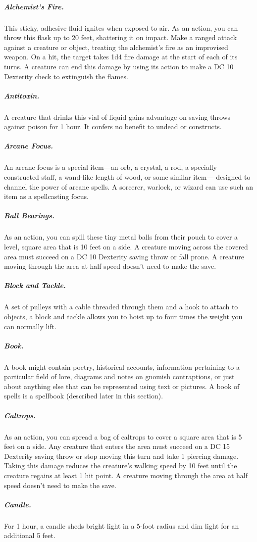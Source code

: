 \subparagraph*{Alchemist's Fire.} This sticky, adhesive fluid ignites when exposed to air. As an action, you can throw this flask up to 20 feet, shattering it on impact. Make a ranged attack against a creature or object, treating the alchemist's fire as an improvised weapon. On a hit, the target takes 1d4 fire damage at the start of each of its turns. A creature can end this damage by using its action to make a DC 10 Dexterity check to extinguish the flames.

\subparagraph*{Antitoxin.} A creature that drinks this vial of liquid gains advantage on saving throws against poison for 1 hour. It confers no benefit to undead or constructs.

\subparagraph*{Arcane Focus.} An arcane focus is a special item—an orb, a crystal, a rod, a specially constructed staff, a wand-like length of wood, or some similar item— designed to channel the power of arcane spells. A sorcerer, warlock, or wizard can use such an item as a spellcasting focus.

\subparagraph*{Ball Bearings.} As an action, you can spill these tiny metal balls from their pouch to cover a level, square area that is 10 feet on a side. A creature moving across the covered area must succeed on a DC 10 Dexterity saving throw or fall prone. A creature moving through the area at half speed doesn't need to make the save.

\subparagraph*{Block and Tackle.} A set of pulleys with a cable threaded through them and a hook to attach to objects, a block and tackle allows you to hoist up to four times the weight you can normally lift.

\subparagraph*{Book.} A book might contain poetry, historical accounts, information pertaining to a particular field of lore, diagrams and notes on gnomish contraptions, or just about anything else that can be represented using text or pictures. A book of spells is a spellbook (described later in this section).

\subparagraph*{Caltrops.} As an action, you can spread a bag of caltrops to cover a square area that is 5 feet on a side. Any creature that enters the area must succeed on a DC 15 Dexterity saving throw or stop moving this turn and take 1 piercing damage. Taking this damage reduces the creature's walking speed by 10 feet until the creature regains at least 1 hit point. A creature moving through the area at half speed doesn't need to make the save.

\subparagraph*{Candle.} For 1 hour, a candle sheds bright light in a 5-foot radius and dim light for an additional 5 feet.


